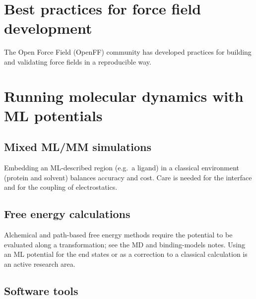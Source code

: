 \documentclass[english,course]{lecture}
\begin{document}
\section{Best practices for force field development}

The Open Force Field (OpenFF) community has developed practices for building and validating force fields in a reproducible way.


\vfill
\eject


\section{Running molecular dynamics with ML potentials}

\subsection{Mixed ML/MM simulations}

Embedding an ML-described region (e.g.\ a ligand) in a classical environment (protein and solvent) balances accuracy and cost. Care is needed for the interface and for the coupling of electrostatics.

\subsection{Free energy calculations}

Alchemical and path-based free energy methods require the potential to be evaluated along a transformation; see the MD and binding-models notes. Using an ML potential for the end states or as a correction to a classical calculation is an active research area.

\subsection{Software tools}
\end{document}
